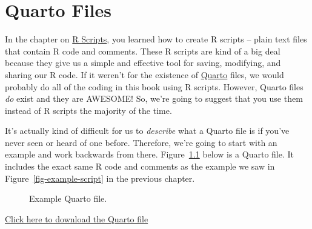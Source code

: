 \documentclass[
  letterpaper,
  DIV=11,
  numbers=noendperiod]{scrreprt}
\begin{document}
\chapter{Quarto Files}\label{quarto-files}

In the chapter on \hyperref[r-scripts]{R Scripts}, you learned how to
create R scripts -- plain text files that contain R code and comments.
These R scripts are kind of a big deal because they give us a simple and
effective tool for saving, modifying, and sharing our R code. If it
weren't for the existence of \href{https://quarto.org/}{Quarto} files,
we would probably do all of the coding in this book using R scripts.
However, Quarto files \emph{do} exist and they are AWESOME! So, we're
going to suggest that you use them instead of R scripts the majority of
the time.

It's actually kind of difficult for us to \emph{describe} what a Quarto
file is if you've never seen or heard of one before. Therefore, we're
going to start with an example and work backwards from there.
Figure~\ref{fig-example-quarto} below is a Quarto file. It includes the
exact same R code and comments as the example we saw in
Figure~\ref{fig-example-script} in the previous chapter.

\begin{figure}


\caption{\label{fig-example-quarto}Example Quarto file.}

\end{figure}%

\href{https://www.dropbox.com/scl/fi/f94bvm9tc8uysdn7wdmd1/example_quarto.qmd?rlkey=xph6sib0hwct98rfbumt68600&dl=1}{Click
here to download the Quarto file}
\end{document}
